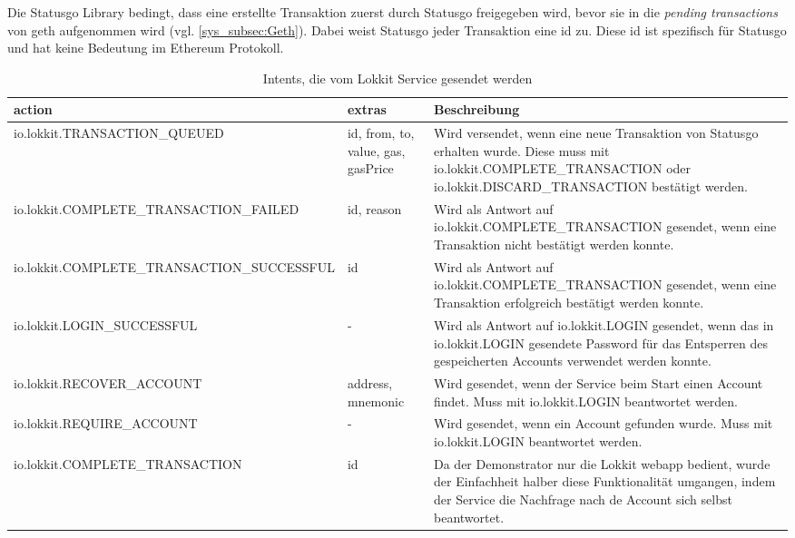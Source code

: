 Die Statusgo Library bedingt, dass eine erstellte Transaktion zuerst durch Statusgo freigegeben wird, bevor sie in die \emph{pending transactions} von geth aufgenommen wird (vgl. \ref{sys_subsec:Geth}). Dabei weist Statusgo jeder Transaktion eine id zu. Diese id ist spezifisch für Statusgo und hat keine Bedeutung im Ethereum Protokoll.

\begin{table}[H]
\centering
\caption{Intents, die vom Lokkit Service gesendet werden}
\label{tbl:LokktService_SendIntents}
\begin{tabular}{@{}L{3cm}L{2cm}L{10cm}@{}}
\toprule
action & extras & Beschreibung \\ \midrule
io.lokkit.\newline{}TRANSACTION\newline{}\_QUEUED\newline{} & id, from, to, value, gas, gasPrice & Wird versendet, wenn eine neue Transaktion von Statusgo erhalten wurde. Diese muss mit io.lokkit.COMPLETE\_TRANSACTION oder io.lokkit.DISCARD\_TRANSACTION bestätigt werden. \\\midrule
io.lokkit.\newline{}COMPLETE\newline{}\_TRANSACTION\newline{}\_FAILED & id, reason & Wird als Antwort auf io.lokkit.COMPLETE\_TRANSACTION gesendet, wenn eine Transaktion nicht bestätigt werden konnte. \\\midrule
io.lokkit.\newline{}COMPLETE\newline{}\_TRANSACTION\newline{}\_SUCCESSFUL & id & Wird als Antwort auf io.lokkit.COMPLETE\_TRANSACTION gesendet, wenn eine Transaktion erfolgreich bestätigt werden konnte. \\\midrule
io.lokkit.\newline{}LOGIN\newline{}\_SUCCESSFUL & - & Wird als Antwort auf io.lokkit.LOGIN gesendet, wenn das in io.lokkit.LOGIN gesendete Password für das Entsperren des gespeicherten Accounts verwendet werden konnte. \\\midrule
io.lokkit.\newline{}RECOVER\newline{}\_ACCOUNT & address, mnemonic & Wird gesendet, wenn der Service beim Start einen Account findet. Muss mit io.lokkit.LOGIN beantwortet werden. \\\midrule
io.lokkit.\newline{}REQUIRE\newline{}\_ACCOUNT & - & Wird gesendet, wenn ein Account gefunden wurde. Muss mit io.lokkit.LOGIN beantwortet werden. \\\midrule
io.lokkit.\newline{}COMPLETE\newline{}\_TRANSACTION & id & Da der Demonstrator nur die Lokkit webapp bedient, wurde der Einfachheit halber diese Funktionalität umgangen, indem der Service die Nachfrage nach de Account sich selbst beantwortet. \\
\bottomrule
\end{tabular}
\end{table}


